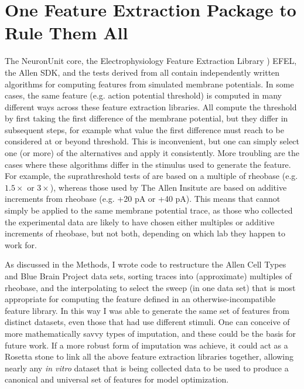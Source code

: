 \section{One Feature Extraction Package to Rule Them All}
The NeuronUnit core, the Electrophysiology Feature Extraction Library \citep{EFEL}) EFEL, the Allen SDK, and the tests derived from \citep{druckmann2008evaluating} all contain independently written algorithms for computing features from simulated membrane potentials.
In some cases, the same feature (e.g. action potential threshold) is computed in many different ways across these feature extraction libraries.
All compute the threshold by first taking the first difference of the membrane potential, but they differ in subsequent steps, for example what value the first difference must reach to be considered at or beyond threshold.
This is inconvenient, but one can simply select one (or more) of the alternatives and apply it consistently.
More troubling are the cases where these algorithms differ in the stimulus used to generate the feature.
For example, the suprathreshold tests of \citep{druckmann2008evaluating} are based on a multiple of rheobase (e.g. $1.5\times$ or $3\times$), whereas those used by The Allen Insitute are based on additive increments from rheobase (e.g. +20 pA or +40 pA).
This means that cannot simply be applied to the same membrane potential trace, as those who collected the experimental data are likely to have chosen either multiples or additive increments of rheobase, but not both, depending on which lab they happen to work for.

As discussed in the Methods, I wrote code to restructure the Allen Cell Types and Blue Brain Project data sets, sorting traces into (approximate) multiples of rheobase, and the interpolating to select the sweep (in one data set) that is most appropriate for computing the feature defined in an otherwise-incompatible feature library.
In this way I was able to generate the same set of features from distinct datasets, even those that had use different stimuli.
One can conceive of more mathematically savvy types of imputation, and these could be the basis for future work.
If a more robust form of imputation was achieve, it could act as a Rosetta stone to link all the above feature extraction libraries together, allowing nearly any \emph{in vitro} dataset that is being collected data to be used to produce a canonical and universal set of features for model optimization.

